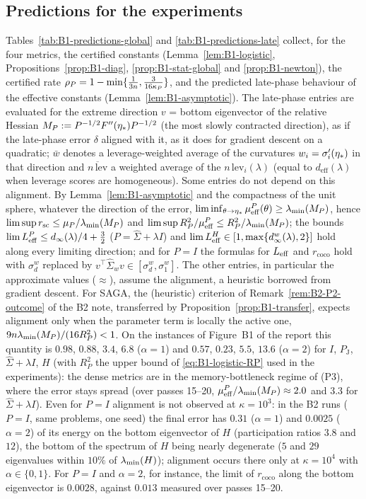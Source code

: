 \subsection{Predictions for the experiments}
\label{sec:B1-predictions}

Tables~\ref{tab:B1-predictions-global} and \ref{tab:B1-predictions-late} collect, for the four metrics,
the certified constants (Lemma~\ref{lem:B1-logistic}, Propositions~\ref{prop:B1-diag},
\ref{prop:B1-stat-global} and \ref{prop:B1-newton}), the certified rate
$\rho_P=1-\min\{\frac1{3n},\frac{3}{16\kappa_P}\}$, and the predicted late-phase behaviour of the
effective constants (Lemma~\ref{lem:B1-asymptotic}). The late-phase entries are evaluated for the extreme
direction $v$ = bottom eigenvector of the relative Hessian $M_P:=P^{-1/2}F''(\eta_\ast)P^{-1/2}$ (the most
slowly contracted direction), as if the late-phase error $\delta$ aligned with it, as it does for gradient
descent on a quadratic; $\bar w$ denotes a leverage-weighted average of the curvatures $w_i=\sigma_i'(\eta_\ast)$
in that direction and $\overline{n\,\mathrm{lev}}$ a weighted average of the $n\,\mathrm{lev}_i(\lambda)$ (equal to
$d_{\mathrm{eff}}(\lambda)$ when leverage scores are homogeneous). Some entries do not depend on this
alignment. By Lemma~\ref{lem:B1-asymptotic} and the compactness of the unit sphere, whatever the direction of
the error, $\liminf_{\theta\to\eta_\ast}\mu_{\mathrm{eff}}^P(\theta)\ge\lambda_{\min}(M_P)$, hence $\limsup r_{\mathrm{sc}}\le\mu_P/\lambda_{\min}(M_P)$
and $\limsup R_P^2/\mu_{\mathrm{eff}}^P\le R_P^2/\lambda_{\min}(M_P)$; the bounds $\lim L_{\mathrm{eff}}^P\le d_\infty(\lambda)/4+\frac32$
($P=\hat\Sigma+\lambda I$) and $\lim L_{\mathrm{eff}}^H\in[1,\max\{d^w_\infty(\lambda),2\}]$ hold along every limiting
direction; and for $P=I$ the formulas for $L_{\mathrm{eff}}$ and $r_{\mathrm{coco}}$ hold with $\sigma^w_d$ replaced by
$v^\top\hat\Sigma_wv\in[\sigma^w_d,\sigma^w_1]$. The other entries, in particular the approximate values
($\approx$), assume the alignment, a heuristic borrowed from gradient descent. For SAGA, the (heuristic)
criterion of Remark~\ref{rem:B2-P2-outcome} of the B2 note, transferred by Proposition~\ref{prop:B1-transfer},
expects alignment only when the parameter term is locally the active one, $9n\lambda_{\min}(M_P)/(16R_P^2)<1$. On the
instances of Figure~B1 of the report this quantity is $0.98$, $0.88$, $3.4$, $6.8$ ($\alpha=1$) and $0.57$,
$0.23$, $5.5$, $13.6$ ($\alpha=2$) for $I$, $P_{\mathrm J}$, $\hat\Sigma+\lambda I$, $H$ (with $R_P^2$ the upper
bound of \eqref{eq:B1-logistic-RP} used in the experiments): the dense metrics are in the memory-bottleneck
regime of (P3), where the error stays spread (over passes 15--20, $\mu_{\mathrm{eff}}^P/\lambda_{\min}(M_P)\approx2.0$ and $3.3$ for
$\hat\Sigma+\lambda I$). Even for $P=I$ alignment is not observed at $\kappa=10^3$: in the B2 runs ($P=I$, same
problems, one seed) the final error has $0.31$ ($\alpha=1$) and $0.0025$ ($\alpha=2$) of its energy on the bottom
eigenvector of $H$ (participation ratios $3.8$ and $12$), the bottom of the spectrum of $H$ being nearly
degenerate ($5$ and $29$ eigenvalues within $10\%$ of $\lambda_{\min}(H)$); alignment occurs there only at $\kappa=10^4$
with $\alpha\in\{0,1\}$. For $P=I$ and $\alpha=2$, for instance, the limit of $r_{\mathrm{coco}}$ along the bottom
eigenvector is $0.0028$, against $0.013$ measured over passes 15--20.

